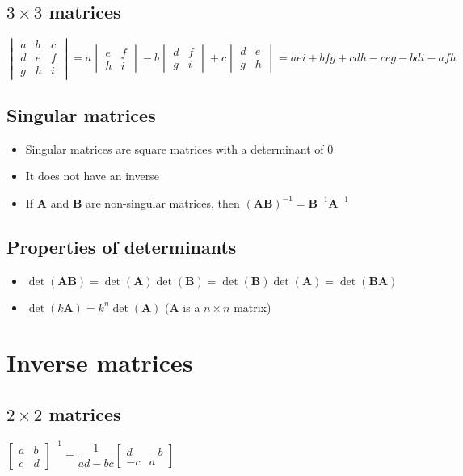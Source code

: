 \subsection{$3\times3$ matrices}

$\begin{vmatrix}a&b&c\\d&e&f\\g&h&i\end{vmatrix}=a\begin{vmatrix}e&f\\h&i\end{vmatrix}-b\begin{vmatrix}d&f\\g&i\end{vmatrix}+c\begin{vmatrix}d&e\\g&h\end{vmatrix}=aei+bfg+cdh-ceg-bdi-afh$

\subsection{Singular matrices}
\begin{itemize}
	\item Singular matrices are square matrices with a determinant of 0
	\item It does not have an inverse
	\item If $\mathbf{A}$ and $\mathbf{B}$ are non-singular matrices, then $(\mathbf{AB})^{-1}=\mathbf{B}^{-1}\mathbf{A}^{-1}$
\end{itemize}



\subsection{Properties of determinants}
\begin{itemize}
	\item $\det(\mathbf{AB})=\det(\mathbf{A})\det(\mathbf{B})=\det(\mathbf{B})\det(\mathbf{A})=\det(\mathbf{BA})$
	\item $\det(k\mathbf{A})=k^n\det(\mathbf{A})$ ($\mathbf{A}$ is a $n\times n$ matrix)
\end{itemize}


\section{Inverse matrices}
\subsection{$2\times2$ matrices}
$\begin{bmatrix}
	a & b\\c & d
\end{bmatrix}^{-1}=\dfrac{1}{ad-bc}\begin{bmatrix}
	d & -b\\-c & a
\end{bmatrix}$

